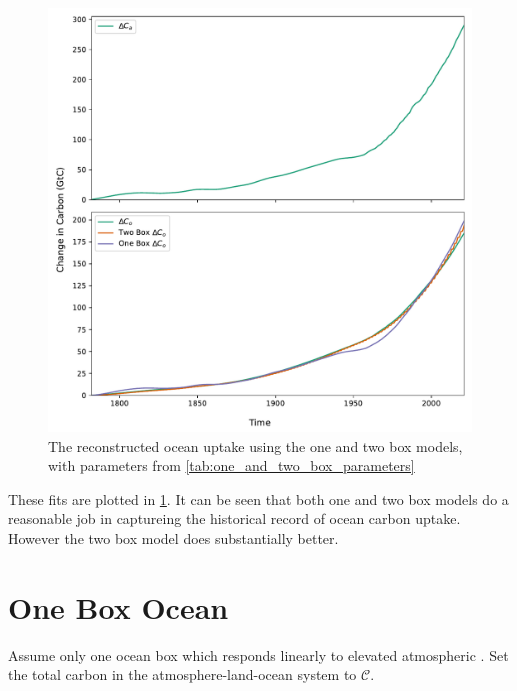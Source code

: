 \begin{figure}
  \centering
  \includegraphics[keepaspectratio,width=\textwidth]{gcb_ocean_atmosphere_boxes}
  \caption{The reconstructed ocean uptake using the one and two box models, with parameters from \cref{tab:one_and_two_box_parameters}}
  \label{fig:fits_from_one_and_two}
\end{figure}


These fits are plotted in \cref{fig:fits_from_one_and_two}. It can be seen that both one and two box models do a reasonable job in captureing the
historical record of ocean carbon uptake. However the two box model does substantially better.
\section{One Box Ocean}
Assume only one ocean box which responds linearly to elevated atmospheric . Set the
total carbon in the atmosphere-land-ocean system to $\mathcal{C}$.

